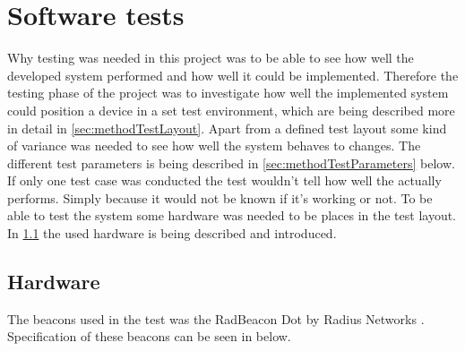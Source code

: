 \section{Software tests}\label{sec:methodSoftwareTests}





Why testing was needed in this project was to be able to see how well the developed system performed and how well it could be implemented.
Therefore the testing phase of the project was to investigate how well the implemented system could position a device in a set test environment, which are being described more in detail in \cref{sec:methodTestLayout}.
Apart from a defined test layout some kind of variance was needed to see how well the system behaves to changes. The different test parameters is being described in \cref{sec:methodTestParameters} below.
If only one test case was conducted the test wouldn't tell how well the actually performs.
Simply because it would not be known if it's working or not.
To be able to test the system some hardware was needed to be places in the test layout. In \cref{sec:methodTestHardware} the used hardware is being described and introduced.


\subsection{Hardware}\label{sec:methodTestHardware}
The beacons used in the test was the RadBeacon Dot by Radius Networks \cite{RadBeaconDotDatasheet}.
Specification of these beacons can be seen in  below.

